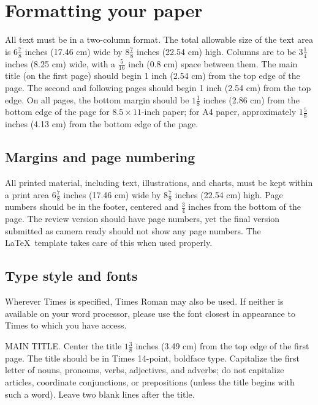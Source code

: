 \documentclass[10pt,twocolumn,letterpaper]{article}
\begin{document}
  \section{Formatting your paper}
  \label{sec:formatting}

  All text must be in a two-column format.
  The total allowable size of the text area is $6\frac78$ inches (17.46 cm) wide by $8\frac78$ inches (22.54 cm) high.
  Columns are to be $3\frac14$ inches (8.25 cm) wide, with a $\frac{5}{16}$ inch (0.8 cm) space between them.
  The main title (on the first page) should begin 1 inch (2.54 cm) from the top edge of the page.
  The second and following pages should begin 1 inch (2.54 cm) from the top edge.
  On all pages, the bottom margin should be $1\frac{1}{8}$ inches (2.86 cm) from the bottom edge of the page for $8.5 \times 11$-inch paper;
  for A4 paper, approximately $1\frac{5}{8}$ inches (4.13 cm) from the bottom edge of the
  page.

  \subsection{Margins and page numbering}

  All printed material, including text, illustrations, and charts, must be kept
  within a print area $6\frac{7}{8}$ inches (17.46 cm) wide by $8\frac{7}{8}$ inches (22.54 cm)
  high.
  Page numbers should be in the footer, centered and $\frac{3}{4}$ inches from the bottom of the page.
  The review version should have page numbers, yet the final version submitted as camera ready should not show any page numbers.
  The \LaTeX\ template takes care of this when used properly.



  \subsection{Type style and fonts}

  Wherever Times is specified, Times Roman may also be used.
  If neither is available on your word processor, please use the font closest in
  appearance to Times to which you have access.

  MAIN TITLE.
  Center the title $1\frac{3}{8}$ inches (3.49 cm) from the top edge of the first page.
  The title should be in Times 14-point, boldface type.
  Capitalize the first letter of nouns, pronouns, verbs, adjectives, and adverbs;
  do not capitalize articles, coordinate conjunctions, or prepositions (unless the title begins with such a word).
  Leave two blank lines after the title.
\end{document}
